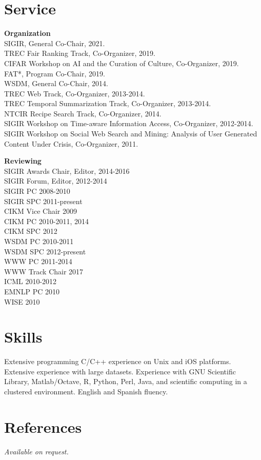 \documentclass{article}
\begin{document}
\section{Service}\noindent\textbf{Organization}\\
SIGIR, General Co-Chair, 2021.\\
TREC Fair Ranking Track, Co-Organizer, 2019.\\
CIFAR Workshop on AI and the Curation of Culture, Co-Organizer, 2019.\\
FAT*, Program Co-Chair, 2019.\\
WSDM, General Co-Chair, 2014.\\
TREC Web Track, Co-Organizer, 2013-2014.\\
TREC Temporal Summarization Track, Co-Organizer, 2013-2014.\\
NTCIR Recipe Search Track, Co-Organizer, 2014.\\
SIGIR Workshop on Time-aware Information Access, Co-Organizer, 2012-2014.\\
SIGIR Workshop on Social Web Search and Mining: Analysis of User Generated Content Under Crisis, Co-Organizer, 2011.
	
\vspace{\baselineskip}
\noindent\textbf{Reviewing}\\
SIGIR Awards Chair, Editor, 2014-2016\\
SIGIR Forum, Editor, 2012-2014\\
SIGIR PC 2008-2010\\
SIGIR SPC 2011-present\\
CIKM Vice Chair 2009\\
CIKM PC 2010-2011, 2014\\
CIKM SPC 2012\\
WSDM PC 2010-2011\\
WSDM SPC 2012-present\\
WWW PC 2011-2014\\
WWW Track Chair 2017\\
ICML 2010-2012\\
EMNLP PC 2010\\
WISE 2010






\section{Skills}\noindent Extensive programming C/C++ experience on Unix and iOS platforms. Extensive experience with  large datasets.  Experience with GNU Scientific Library, Matlab/Octave, R, Python, Perl, Java, and scientific computing in a clustered environment. English and Spanish fluency.



\section{References}\noindent \emph{Available on request.}

\end{document}
